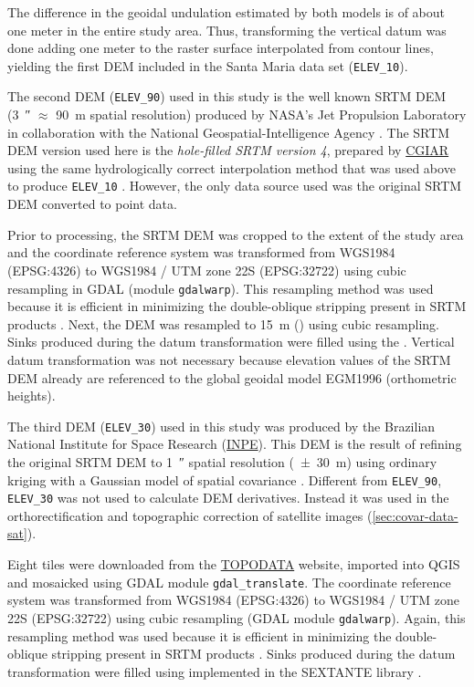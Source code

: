 The difference in the geoidal undulation estimated by both models is of about one meter in the 
entire study area. Thus, transforming the vertical datum was done adding one meter to the raster 
surface interpolated from contour lines, yielding the first DEM included in the Santa Maria data set
(\texttt{ELEV\_10}).

The second DEM (\texttt{ELEV\_90}) used in this study is the well known SRTM DEM 
(\SI{3}{\arcsecond} $\approx$ \SI{90}{\metre} spatial resolution) produced by NASA’s Jet 
Propulsion Laboratory in collaboration with the National Geospatial-Intelligence Agency 
\cite{RodriguezEtAl2006}. The SRTM DEM version used here is the \emph{hole-filled SRTM version 
\num{4}}, prepared by \href{http://www.cgiar.org/}{CGIAR} using the same hydrologically correct 
interpolation method that was used above to produce \texttt{ELEV\_10} \cite{ReuterEtAl2007, 
JarvisEtAl2008}. However, the only data source used was the original SRTM DEM converted to point 
data.

Prior to processing, the SRTM DEM was cropped to the extent of the study area and the coordinate 
reference system was transformed from WGS1984 (EPSG:4326) to WGS1984 / UTM zone 22S (EPSG:32722) 
using cubic resampling in GDAL (module \texttt{gdalwarp}). This resampling method was used because 
it is efficient in minimizing the double-oblique stripping present in SRTM products 
\cite{Samuel-RosaEtAl2013c}. Next, the DEM was resampled to \SI{15}{\metre} 
() using cubic resampling. Sinks produced during the datum transformation 
were filled using the . Vertical datum transformation was not necessary because 
elevation values of the SRTM DEM already are referenced to the global geoidal model EGM1996 
(orthometric heights).

The third DEM (\texttt{ELEV\_30}) used in this study was produced by the Brazilian National 
Institute for Space Research (\href{http://www.inpe.br/}{INPE}). This DEM is the result of refining 
the original SRTM DEM to \SI{1}{\arcsecond} spatial resolution (\SI{\pm30}{\metre}) using ordinary 
kriging with a Gaussian model of spatial covariance \cite{ValerianoEtAl2012}. Different from 
\texttt{ELEV\_90}, \texttt{ELEV\_30} was not used to calculate DEM derivatives. Instead it was used 
in the orthorectification and topographic correction of satellite images (\ref{sec:covar-data-sat}).

Eight tiles were downloaded from the \href{http://www.dsr.inpe.br/topodata/}{TOPODATA} website, 
imported into QGIS and mosaicked using GDAL module \texttt{gdal\_translate}. The coordinate 
reference system was transformed from WGS1984 (EPSG:4326) to WGS1984 / UTM zone 22S (EPSG:32722) 
using cubic resampling (GDAL module \texttt{gdalwarp}). Again, this resampling method was used 
because it is efficient in minimizing the double-oblique stripping present in SRTM products 
\cite{Samuel-RosaEtAl2013c}. Sinks produced during the datum transformation were filled using 
 implemented in the SEXTANTE library \cite{SEXTANTE2012}.

